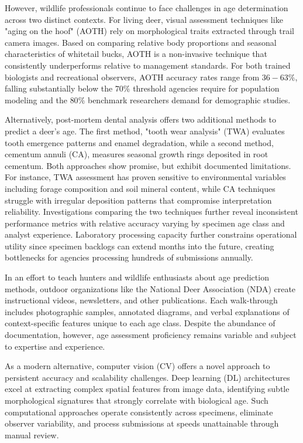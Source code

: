 \documentclass{iopjournal}
\begin{document}
However, wildlife professionals continue to face challenges in age determination across two distinct contexts. For living deer, visual assessment techniques like "aging on the hoof" (AOTH) rely on morphological traits extracted through trail camera images. Based on comparing relative body proportions and seasonal characteristics of whitetail bucks, AOTH is a non-invasive technique that consistently underperforms relative to management standards. For both trained biologists and recreational observers, AOTH accuracy rates range from $36-63\%$, falling substantially below the $70\%$ threshold agencies require for population modeling and the $80\%$ benchmark researchers demand for demographic studies.

Alternatively, post-mortem dental analysis offers two additional methods to predict a deer's age. The first method, "tooth wear analysis" (TWA) evaluates tooth emergence patterns and enamel degradation, while a second method, cementum annuli (CA), measures seasonal growth rings deposited in root cementum. Both approaches show promise, but exhibit documented limitations. For instance, TWA assessment has proven sensitive to environmental variables including forage composition and soil mineral content, while CA techniques struggle with irregular deposition patterns that compromise interpretation reliability. Investigations comparing the two techniques further reveal inconsistent performance metrics with relative accuracy varying by specimen age class and analyst experience. Laboratory processing capacity further constrains operational utility since specimen backlogs can extend months into the future, creating bottlenecks for agencies processing hundreds of submissions annually.

In an effort to teach hunters and wildlife enthusiasts about age prediction methods, outdoor organizations like the National Deer Association (NDA) create instructional videos, newsletters, and other publications. Each walk-through includes photographic samples, annotated diagrams, and verbal explanations of context-specific features unique to each age class. Despite the abundance of documentation, however, age assessment proficiency remains variable and subject to expertise and experience.

As a modern alternative, computer vision (CV) offers a novel approach to persistent accuracy and scalability challenges. Deep learning (DL) architectures excel at extracting complex spatial features from image data, identifying subtle morphological signatures that strongly correlate with biological age. Such computational approaches operate consistently across specimens, eliminate observer variability, and process submissions at speeds unattainable through manual review.
\end{document}
